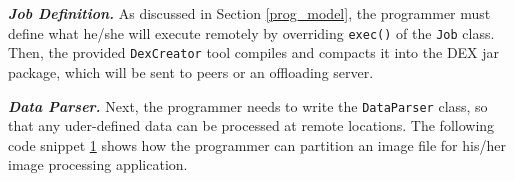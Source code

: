 \documentclass{sig-alternate}
\begin{document}
\textbf{\emph{Job Definition.}} As discussed in Section \ref{prog_model}, the programmer must define what he/she will execute remotely by overriding \texttt{exec()} of the \texttt{Job} class. Then, the provided \texttt{DexCreator} tool compiles and compacts it into the DEX jar package, which will be sent to peers or an offloading server. 



\textbf{\emph{Data Parser.}} Next, the programmer needs to write the \texttt{DataParser} class, so that any uder-defined data can be processed at remote locations. The following code snippet \ref{code:get_single_part} shows how the programmer can partition an image file for his/her image processing application.


\begin{figure} [!tbh]
\noindent {}	
  \label{code:get_single_part}
\end{figure}
\end{document}
